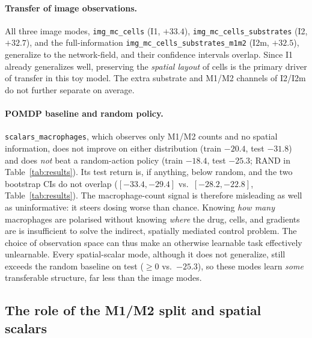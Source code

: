 \documentclass{article}
\begin{document}
\paragraph{Transfer of image observations.}
All three image modes, \texttt{img\_mc\_cells} (I1, $+33.4$),
\texttt{img\_mc\_cells\_substrates} (I2, $+32.7$), and the full-information
\texttt{img\_mc\_cells\_substrates\_m1m2} (I2m, $+32.5$), generalize to the
network-field, and their confidence intervals overlap.
Since I1 already generalizes well, preserving the \emph{spatial layout} of cells
is the primary driver of transfer in this toy model. The extra substrate and
M1/M2 channels of I2/I2m do not further separate on average.

\paragraph{POMDP baseline and random policy.}
\texttt{scalars\_macrophages}, which observes only M1/M2 counts and no spatial
information, does not improve on either distribution (train $-20.4$, test
$-31.8$) and does \emph{not} beat a random-action policy
(train $-18.4$, test $-25.3$; RAND in Table~\ref{tab:results}). Its test return
is, if anything, below random, and the two bootstrap CIs do not overlap
($[-33.4,-29.4]$ vs.\ $[-28.2,-22.8]$, Table~\ref{tab:results}). The
macrophage-count signal is therefore misleading as well as uninformative: it
steers dosing worse than chance.
Knowing \emph{how many} macrophages are polarised without knowing \emph{where}
the drug, cells, and gradients are is insufficient to solve the indirect,
spatially mediated control problem. The choice of observation space can thus
make an otherwise learnable task effectively unlearnable. Every spatial-scalar
mode, although it does not generalize, still exceeds the random baseline on test
($\ge 0$ vs.\ $-25.3$), so these modes learn \emph{some} transferable
structure, far less than the image modes.


\subsection{The role of the M1/M2 split and spatial scalars}
\end{document}
